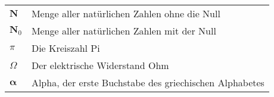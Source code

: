 
\begin{table}[h!]
\noindent\begin{tabular}{@{}p{2cm}l}
$\mathbf{N}$        & Menge aller natürlichen Zahlen ohne die Null \\
$\mathbf{N}_{0}$    & Menge aller natürlichen Zahlen mit der Null \\
$\pi$               & Die Kreiszahl Pi \\
$\Omega$            & Der elektrische Widerstand Ohm \\
$\boldsymbol\alpha$ & Alpha, der erste Buchstabe des griechischen Alphabetes \\
\end{tabular}
\end{table}
